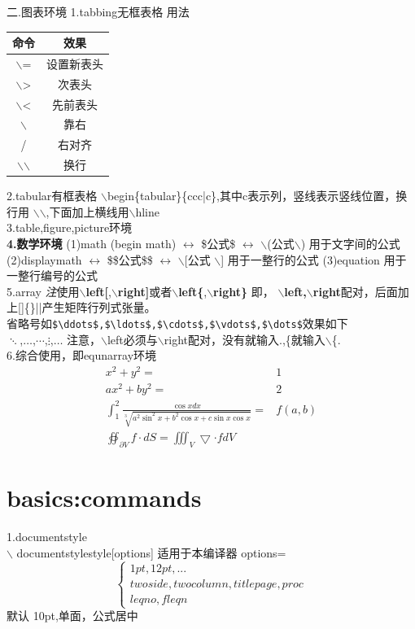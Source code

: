 \documentclass{article}[20pt]
\begin{document}
二.图表环境
1.tabbing无框表格 用法
\begin{tabular}{|c|c|}\hline
	命令 & 效果 \\ \hline
	$\backslash$= & 设置新表头 \\ \hline
	$\backslash$> & 次表头 \\ \hline
	$\backslash$< & 先前表头 \\ \hline
	$\backslash$ & 靠右   \\ \hline
	/ &右对齐\\ \hline
	$\backslash$$\backslash$ &换行\\ \hline
\end{tabular}
2.tabular有框表格
$\backslash$begin\{tabular\}\{ccc|c\},其中c表示列，竖线表示竖线位置，换行用 $\backslash$$\backslash$,下面加上横线用$\backslash$hline
\\3.table,figure,picture环境
\\{\bf 4.数学环境}
(1)math (begin math) $\longleftrightarrow$ \$公式\$ $\longleftrightarrow$ $\backslash$(公式$\backslash$) 用于文字间的公式
(2)displaymath $\longleftrightarrow$ \$\$公式\$\$ $\longleftrightarrow$ $\backslash$[公式 $\backslash$] 用于一整行的公式
(3)equation 用于一整行编号的公式
\\5.array
{\it 注}使用{\bf$\backslash$left[},{\bf $\backslash$right]}或者{\bf$\backslash$left\{},{\bf $\backslash$right\}}
即，
{\bf $\backslash$left,$\backslash$right}配对，后面加上[]\{\}||产生矩阵行列式张量。\\省略号如\verb|$\ddots$,$\ldots$,$\cdots$,$\vdots$,$\dots$|效果如下\\
$\ddots$,$\ldots$,$\cdots$,$\vdots$,$\dots$
注意，$\backslash$left必须与$\backslash$right配对，没有就输入.,\{就输入$\backslash$\{.
\\6.综合使用，即equnarray环境
\begin{eqnarray}
x^2+y^2=&1\\ 
ax^2+by^2=&2\\ 
\int_{1}^{2}{\frac{\cos 
		{ x}dx}{\sqrt[3]{
			a^2 \sin ^2{ x} 
			+b^2 \cos 
			{x} +c 
			\sin {x}
			 \cos{ x}}}}
		 = & f(a,b)\\
		 \oiint_{\partial V}f\cdot dS=\iiint_V \bigtriangledown\cdot f dV
\end{eqnarray}

\part{basics:commands}
1.documentstyle
\\$\backslash$ documentstyle{style}[options] 适用于本编译器
 options= $$\left\{
\begin{array}{c}
	1pt,12pt,... \\
	twoside,twocolumn,titlepage,proc\\
	leqno,fleqn
\end{array}\right.$$
默认 10pt,单面，公式居中
\end{document}
